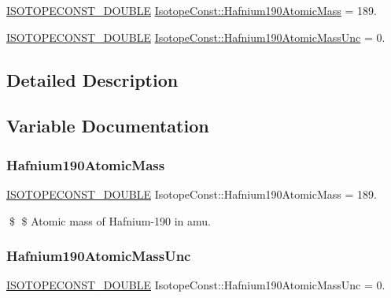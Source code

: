 \begin{DoxyCompactItemize}
\item 
\mbox{\hyperlink{group___isotope_const-_macros_ga8f45a7272ce02c0b4c65c44636ed719a}{I\+S\+O\+T\+O\+P\+E\+C\+O\+N\+S\+T\+\_\+\+D\+O\+U\+B\+LE}} \mbox{\hyperlink{group___isotope_const-_hafnium-_hf190_ga0102a6d877d51cf3123749c680e2ce88}{Isotope\+Const\+::\+Hafnium190\+Atomic\+Mass}} = 189.
\item 
\mbox{\hyperlink{group___isotope_const-_macros_ga8f45a7272ce02c0b4c65c44636ed719a}{I\+S\+O\+T\+O\+P\+E\+C\+O\+N\+S\+T\+\_\+\+D\+O\+U\+B\+LE}} \mbox{\hyperlink{group___isotope_const-_hafnium-_hf190_gad369272a5c32b8e535571165582c8a71}{Isotope\+Const\+::\+Hafnium190\+Atomic\+Mass\+Unc}} = 0.
\end{DoxyCompactItemize}


\subsection{Detailed Description}


\subsection{Variable Documentation}
\mbox{\label{group___isotope_const-_hafnium-_hf190_ga0102a6d877d51cf3123749c680e2ce88}} 
\subsubsection{\texorpdfstring{Hafnium190\+Atomic\+Mass}{Hafnium190AtomicMass}}
{\footnotesize\ttfamily \mbox{\hyperlink{group___isotope_const-_macros_ga8f45a7272ce02c0b4c65c44636ed719a}{I\+S\+O\+T\+O\+P\+E\+C\+O\+N\+S\+T\+\_\+\+D\+O\+U\+B\+LE}} Isotope\+Const\+::\+Hafnium190\+Atomic\+Mass = 189.}

\$ \$ Atomic mass of Hafnium-\/190 in amu. \mbox{\label{group___isotope_const-_hafnium-_hf190_gad369272a5c32b8e535571165582c8a71}} 
\subsubsection{\texorpdfstring{Hafnium190\+Atomic\+Mass\+Unc}{Hafnium190AtomicMassUnc}}
{\footnotesize\ttfamily \mbox{\hyperlink{group___isotope_const-_macros_ga8f45a7272ce02c0b4c65c44636ed719a}{I\+S\+O\+T\+O\+P\+E\+C\+O\+N\+S\+T\+\_\+\+D\+O\+U\+B\+LE}} Isotope\+Const\+::\+Hafnium190\+Atomic\+Mass\+Unc = 0.}

